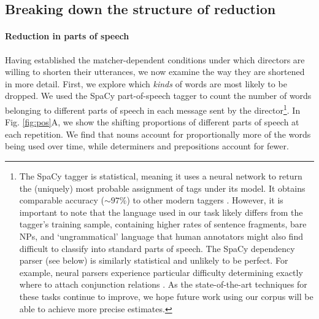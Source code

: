 \documentclass[alpha-refs]{wiley-article}
\begin{document}
\subsection{Breaking down the structure of reduction}\label{reduction}

\paragraph{Reduction in parts of speech}

Having established the matcher-dependent conditions under which directors are willing to shorten their utterances, we now examine the way they are shortened in more detail.
First, we explore which \emph{kinds} of words are most likely to be dropped.
We used the SpaCy part-of-speech tagger \citep{spacy2} to count the number of words belonging to different parts of speech in each message sent by the director\footnote{The SpaCy tagger is statistical, meaning it uses a neural network to return the (uniquely) most probable assignment of tags under its model. It obtains comparable accuracy ($\sim 97\%$) to other modern taggers \citep{manning2011part}. However, it is important to note that the language used in our task likely differs from the tagger's training sample, containing higher rates of sentence fragments, bare NPs, and `ungrammatical' language that human annotators might also find difficult to classify into standard parts of speech. The SpaCy dependency parser (see below) is similarly statistical and unlikely to be perfect. For example, neural parsers experience particular difficulty determining exactly where to attach conjunction relations \citep{ficler-goldberg-2017-improving}. As the state-of-the-art techniques for these tasks continue to improve, we hope future work using our corpus will be able to achieve more precise estimates.}.
In Fig. \ref{fig:pos}A, we show the shifting proportions of different parts of speech at each repetition.
We find that nouns account for proportionally more of the words being used over time, while determiners and prepositions account for fewer.
\end{document}
